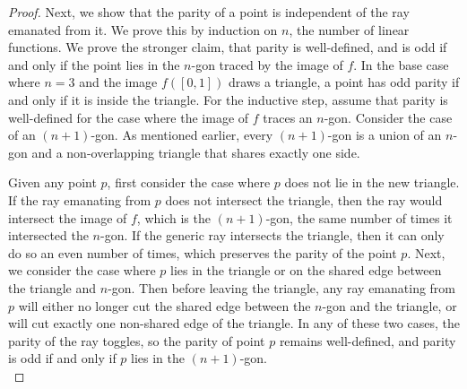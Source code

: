 \documentclass{article}
\begin{document}
\begin{enumerate}
\begin{enumerate}
\begin{proof}
          Next, we show that the parity of a point is independent of the
          ray emanated from it. We prove this by induction on $n$, the
          number of linear functions. We prove the stronger claim, that
          parity is well-defined, and is odd if and only if the point lies
          in the $n$-gon traced by the image of $f$. In the base case where
          $n=3$ and the image $f([0,1])$ draws a triangle, a point has odd
          parity if and only if it is inside the triangle. For the
          inductive step, assume that parity is well-defined for the case
          where the image of $f$ traces an $n$-gon. Consider the case of an
          $(n+1)$-gon. As mentioned earlier, every $(n+1)$-gon is a union
          of an $n$-gon and a non-overlapping triangle that shares exactly
          one side.

          \begin{center}
          \end{center}

          Given any point $p$, first consider the case where $p$ does not
          lie in the new triangle. If the ray emanating from $p$ does not
          intersect the triangle, then the ray would intersect the
          image of $f$, which is the $(n+1)$-gon, the same number of times
          it intersected the $n$-gon. If the generic ray intersects the
          triangle, then it can only do so an even number of times, which
          preserves the parity of the point $p$. Next, we consider the case
          where $p$ lies in the triangle or on the shared edge between the
          triangle and $n$-gon. Then before leaving the triangle, any ray
          emanating from $p$ will either no longer cut the shared edge
          between the $n$-gon and the triangle, or will cut exactly one
          non-shared edge of the triangle. In any of these two cases, the
          parity of the ray toggles, so the parity of point $p$ remains
          well-defined, and parity is odd if and only if $p$ lies in the
          $(n+1)$-gon. \\


\end{proof}
\end{enumerate}
\end{enumerate}
\end{document}
